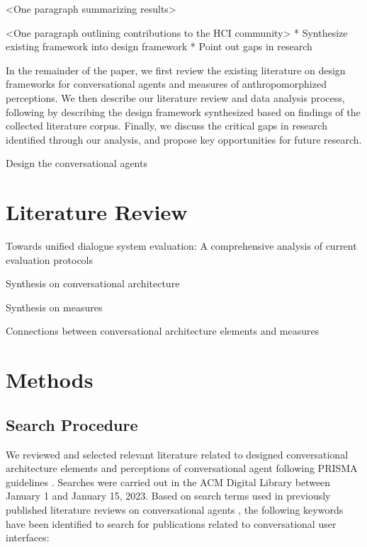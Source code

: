 \documentclass[sigconf,screen,review, anonymous]{acmart}
\begin{document}
<One paragraph summarizing results>

<One paragraph outlining contributions to the HCI community>
* Synthesize existing framework into design framework \newline
* Point out gaps in research \newline

In the remainder of the paper, we first review the existing literature on design frameworks for conversational agents and measures of anthropomorphized perceptions. We then describe our literature review and data analysis process, following by describing the design framework synthesized based on findings of the collected literature corpus. Finally, we discuss the critical gaps in research identified through our analysis, and propose key opportunities for future research.


Design the conversational agents


\section{Literature Review}

\cite{finch2020towards} Towards unified dialogue system evaluation: A comprehensive analysis of current evaluation protocols

Synthesis on conversational architecture

Synthesis on measures

Connections between conversational architecture elements and measures


\section{Methods}

\subsection{Search Procedure}

We reviewed and selected relevant literature related to designed conversational architecture elements and perceptions of conversational agent following PRISMA guidelines \cite{prisma}. Searches were carried out in the ACM Digital Library between January 1 and January 15, 2023. Based on search terms used in previously published literature reviews on conversational agents \cite{clark2019state}\cite{rapp2021human} , the following keywords have been identified to search for publications related to conversational user interfaces:
\newline
\end{document}
